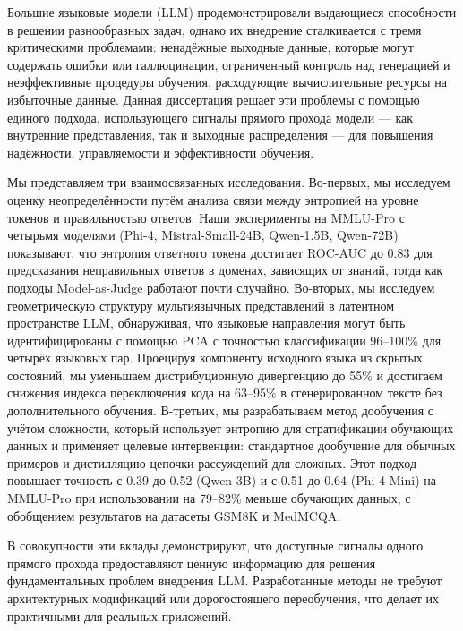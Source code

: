 
Большие языковые модели (LLM) продемонстрировали выдающиеся способности в решении разнообразных задач, однако их внедрение сталкивается с тремя критическими проблемами: ненадёжные выходные данные, которые могут содержать ошибки или галлюцинации, ограниченный контроль над генерацией и неэффективные процедуры обучения, расходующие вычислительные ресурсы на избыточные данные. Данная диссертация решает эти проблемы с помощью единого подхода, использующего сигналы прямого прохода модели --- как внутренние представления, так и выходные распределения --- для повышения надёжности, управляемости и эффективности обучения.

Мы представляем три взаимосвязанных исследования. Во-первых, мы исследуем оценку неопределённости путём анализа связи между энтропией на уровне токенов и правильностью ответов. Наши эксперименты на MMLU-Pro с четырьмя моделями (Phi-4, Mistral-Small-24B, Qwen-1.5B, Qwen-72B) показывают, что энтропия ответного токена достигает ROC-AUC до 0.83 для предсказания неправильных ответов в доменах, зависящих от знаний, тогда как подходы Model-as-Judge работают почти случайно. Во-вторых, мы исследуем геометрическую структуру мультиязычных представлений в латентном пространстве LLM, обнаруживая, что языковые направления могут быть идентифицированы с помощью PCA с точностью классификации 96--100\% для четырёх языковых пар. Проецируя компоненту исходного языка из скрытых состояний, мы уменьшаем дистрибуционную дивергенцию до 55\% и достигаем снижения индекса переключения кода на 63--95\% в сгенерированном тексте без дополнительного обучения. В-третьих, мы разрабатываем метод дообучения с учётом сложности, который использует энтропию для стратификации обучающих данных и применяет целевые интервенции: стандартное дообучение для обычных примеров и дистилляцию цепочки рассуждений для сложных. Этот подход повышает точность с 0.39 до 0.52 (Qwen-3B) и с 0.51 до 0.64 (Phi-4-Mini) на MMLU-Pro при использовании на 79--82\% меньше обучающих данных, с обобщением результатов на датасеты GSM8K и MedMCQA.

В совокупности эти вклады демонстрируют, что доступные сигналы одного прямого прохода предоставляют ценную информацию для решения фундаментальных проблем внедрения LLM. Разработанные методы не требуют архитектурных модификаций или дорогостоящего переобучения, что делает их практичными для реальных приложений.
